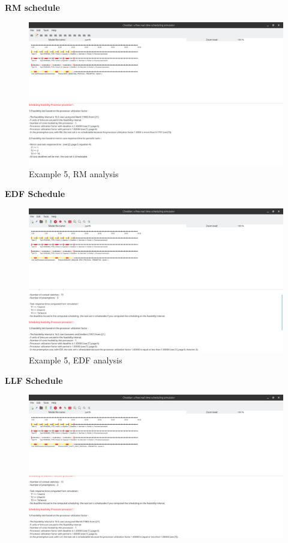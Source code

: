 \documentclass[a4paper,11pt]{article}%
\newenvironment{qanda}{\setlength{\parindent}{0pt}}{\bigskip}
\begin{document}
\begin{qanda}
\begin{enumerate}
\begin{enumerate}
\begin{enumerate}
\begin{enumerate}
						                  \textbf{RM schedule}
						                  \begin{figure}[H]
							                  \centering
							                  \includegraphics[scale=0.36]{figures/ex5_rm.png}
							                  \caption{Example 5, RM analysis}
						                  \end{figure}
						                  \textbf{EDF Schedule}
						                  \begin{figure}[H]
							                  \centering
							                  \includegraphics[scale=0.36]{figures/ex5_edf.png}
							                  \caption{Example 5, EDF analysis}
						                  \end{figure}
						                  \textbf{LLF Schedule}
						                  \begin{figure}[H]
							                  \centering
							                  \includegraphics[scale=0.36]{figures/ex5_llf.png}

\end{figure}
\end{enumerate}
\end{enumerate}
\end{enumerate}
\end{enumerate}
\end{qanda}
\end{document}
